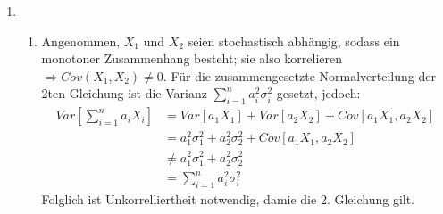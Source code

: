 \documentclass[a4paper]{scrartcl}
\def \blattnr {7}
\begin{document}
\begin{enumerate}[label=\bfseries \blattnr.\arabic*]
\item 
    \begin{enumerate}
        \item 
            Angenommen, $X_1$ und $X_2$ seien stochastisch abhängig, sodass ein
            monotoner Zusammenhang besteht; sie also korrelieren  $\Rightarrow
            Cov(X_1,X_2)\neq 0$.
            Für die zusammengesetzte Normalverteilung der 2ten Gleichung ist
            die  Varianz $\sum_{i=1}^n a_i^2\sigma_i^2$ gesetzt, jedoch:
            \begin{equation*}
                \begin{split}
                    Var\left[ \sum_{i=1}^n a_iX_i \right] 
                    &= Var[a_1X_1] + Var[a_2X_2] + Cov[a_1X_1,a_2X_2] \\
                    &= a_1^2\sigma_1^2 + a_2^2\sigma_2^2 + Cov[a_1X_1,a_2X_2] \\
                    &\neq a_1^2\sigma_1^2 + a_2^2\sigma_2^2 \\
                    &= \sum_{i=1}^n a_i^2\sigma_i^2
                \end{split}
            \end{equation*}
            Folglich ist Unkorrelliertheit notwendig, damie die 2. Gleichung
            gilt.
            \\


\end{enumerate}
\end{enumerate}
\end{document}
